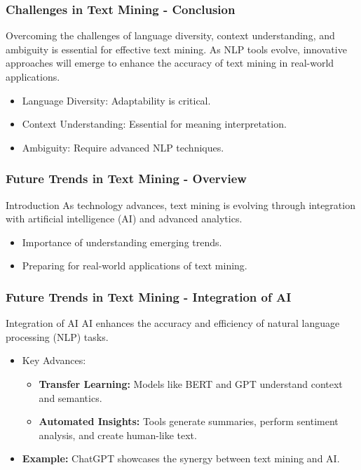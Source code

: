 \documentclass[aspectratio=169]{beamer}
\begin{document}
\begin{frame}[fragile]
    \frametitle{Challenges in Text Mining - Conclusion}
    Overcoming the challenges of language diversity, context understanding, and ambiguity is essential for effective text mining. 
    As NLP tools evolve, innovative approaches will emerge to enhance the accuracy of text mining in real-world applications.
    
    \begin{itemize}
        \item Language Diversity: Adaptability is critical.
        \item Context Understanding: Essential for meaning interpretation.
        \item Ambiguity: Require advanced NLP techniques.
    \end{itemize}
\end{frame}

\begin{frame}[fragile]
    \frametitle{Future Trends in Text Mining - Overview}
    \begin{block}{Introduction}
        As technology advances, text mining is evolving through integration with artificial intelligence (AI) and advanced analytics.
    \end{block}
    \begin{itemize}
        \item Importance of understanding emerging trends.
        \item Preparing for real-world applications of text mining.
    \end{itemize}
\end{frame}

\begin{frame}[fragile]
    \frametitle{Future Trends in Text Mining - Integration of AI}
    \begin{block}{Integration of AI}
        AI enhances the accuracy and efficiency of natural language processing (NLP) tasks.
    \end{block}
    \begin{itemize}
        \item Key Advances:
        \begin{itemize}
            \item \textbf{Transfer Learning:} Models like BERT and GPT understand context and semantics.
            \item \textbf{Automated Insights:} Tools generate summaries, perform sentiment analysis, and create human-like text.
        \end{itemize}
        \item \textbf{Example:} ChatGPT showcases the synergy between text mining and AI.
    \end{itemize}
\end{frame}
\end{document}
